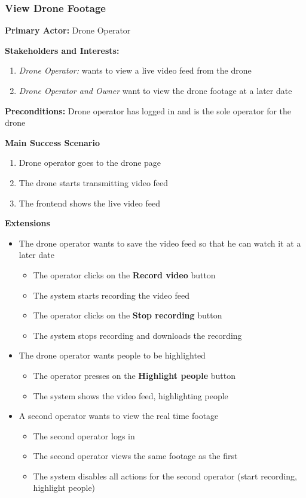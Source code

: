 \subsubsection{\textbf{View Drone Footage}}
\textbf{Primary Actor:} Drone Operator

\textbf{Stakeholders and Interests:}
\begin{enumerate}
    \item \textit{Drone Operator:} wants to view a live video feed from the drone
    \item \textit{Drone Operator and Owner} want to view the drone footage at a later date
\end{enumerate}

\textbf{Preconditions:} Drone operator has logged in and is the sole operator for the drone

\textbf{Main Success Scenario}
\begin{enumerate}
    \item Drone operator goes to the drone page
    \item The drone starts transmitting video feed
    \item The frontend shows the live video feed
\end{enumerate}

\textbf{Extensions}
\begin{itemize}
    \item The drone operator wants to save the video feed so that he can watch it at a later date
        \begin{itemize}
            \item The operator clicks on the \textbf{Record video} button
            \item The system starts recording the video feed
            \item The operator clicks on the \textbf{Stop recording} button
            \item The system stops recording and downloads the recording
        \end{itemize}
    \item The drone operator wants people to be highlighted
            \begin{itemize}
                \item The operator presses on the \textbf{Highlight people} button
                \item The system shows the video feed, highlighting people
            \end{itemize}
    \item A second operator wants to view the real time footage
            \begin{itemize}
                \item The second operator logs in
                \item The second operator views the same footage as the first
                \item The system disables all actions for the second operator (start recording, highlight people)
            \end{itemize}
\end{itemize}

